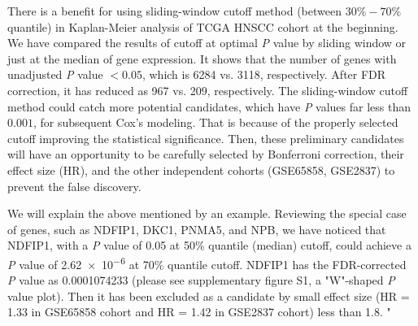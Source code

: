 \documentclass[preprint,12pt]{elsarticle}
\newenvironment{MyIndent}
{\par\leftskip1cm\relax\rightskip1cm\relax}
{\par\leftskip0cm\relax\rightskip0cm\relax}
\newenvironment{MyColorPar}[1]{%
    \leavevmode\color{#1}\ignorespaces%
}{%
}%
\begin{document}
\begin{MyColorPar}{blue}
\begin{MyIndent}
\begin{MyColorPar}{red}


There is a benefit for using sliding-window cutoff method (between $30\%-70\%$ quantile) in Kaplan-Meier analysis of TCGA HNSCC cohort at the beginning.
We have compared the results of cutoff at optimal \textit{P} value by sliding window or just at the median of gene expression.
It shows that the number of genes with unadjusted \textit{P} value $<0.05$, which is 6284 vs. 3118, respectively. After FDR correction, it has reduced as 967 vs. 209, respectively.
The sliding-window cutoff method could catch more potential candidates, which have \textit{P} values far less than $0.001$, for subsequent Cox's modeling.
That is because of the properly selected cutoff improving the statistical significance.
Then, these preliminary candidates will have an opportunity to be carefully selected by Bonferroni correction, their effect size (HR), and the other independent cohorts (GSE65858, GSE2837) to prevent the false discovery.


We will explain the above mentioned by an example.
Reviewing the special case of genes, such as NDFIP1, DKC1, PNMA5, and NPB,
we have noticed that NDFIP1, with a \textit{P} value of 0.05 at 50\% quantile (median) cutoff, could achieve a \textit{P} value of \num{2.62e-6} at 70\% quantile cutoff.
NDFIP1 has the FDR-corrected \textit{P} value as \num[round-precision=3, round-mode=figures,
scientific-notation=true]{0.0001074233} (please see supplementary figure S1, a "W"-shaped \textit{P} value plot). %
Then it has been excluded as a candidate by small effect size (HR = 1.33 in GSE65858 cohort and HR = 1.42 in GSE2837 cohort) less than 1.8.
"


\end{MyColorPar}
\end{MyIndent}
\end{MyColorPar}
\end{document}
